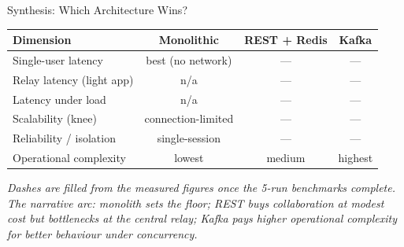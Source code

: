 \documentclass[aspectratio=169]{beamer}
\begin{document}
\begin{frame}{Synthesis: Which Architecture Wins?}

\begin{center}
\small
\begin{tabular}{@{}lccc@{}}
\toprule
\textbf{Dimension} & \textbf{Monolithic} & \textbf{REST + Redis} & \textbf{Kafka} \\
\midrule
Single-user latency      & best (no network) & --- & --- \\
Relay latency (light app)& n/a               & --- & --- \\
Latency under load       & n/a               & --- & --- \\
Scalability (knee)       & connection-limited& --- & --- \\
Reliability / isolation  & single-session    & --- & --- \\
Operational complexity   & lowest            & medium & highest \\
\bottomrule
\end{tabular}
\end{center}

\vspace{0.6em}
\begin{center}
\footnotesize\itshape
Dashes are filled from the measured figures once the 5-run benchmarks
complete. The narrative arc: monolith sets the floor; REST buys
collaboration at modest cost but bottlenecks at the central relay;
Kafka pays higher operational complexity for better behaviour under
concurrency.
\end{center}

\end{frame}
\end{document}
